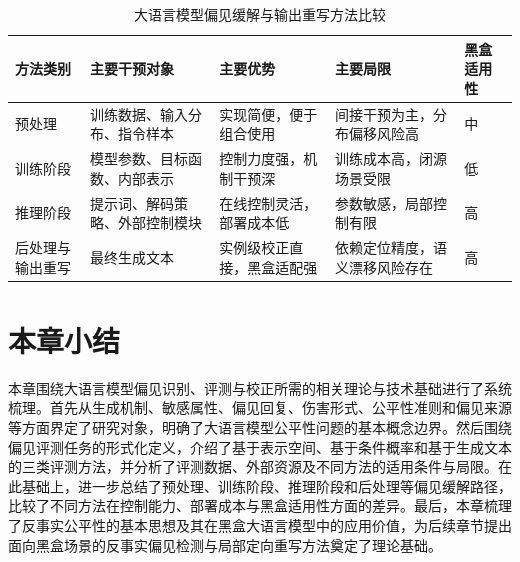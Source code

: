 \begin{table}[hbt]
    \centering
    \caption{大语言模型偏见缓解与输出重写方法比较}
    \label{tab:bias-mitigation-compare}
    \small
    \renewcommand{\tabularxcolumn}[1]{m{#1}}
    \begin{tabularx}{\textwidth}{>{\centering\arraybackslash}m{2.2cm}>{\centering\arraybackslash}m{3.0cm}>{\centering\arraybackslash}X>{\centering\arraybackslash}X>{\centering\arraybackslash}m{1.4cm}}
        \toprule
        方法类别 & 主要干预对象 & 主要优势 & 主要局限 & 黑盒适用性 \\
        \midrule
        预处理\cite{DBLP:journals/coling/GallegosRBTKDYZA24,DBLP:conf/birthday/LuMWAD20,DBLP:conf/emnlp/MaudslayGCT19,DBLP:conf/acl/GhanbarzadehHPM23,DBLP:conf/emnlp/DinanFWUKW20,DBLP:conf/nips/SolaimanD21} & 训练数据、输入分布、指令样本 & 实现简便，便于组合使用 & 间接干预为主，分布偏移风险高 & 中 \\
        训练阶段\cite{DBLP:conf/acl/RavfogelEGTG20,DBLP:conf/acl/LiangLZLSM20,DBLP:conf/icassp/WooNJL23,DBLP:conf/acl/GuoYA22,DBLP:conf/emnlp/GaciBCB22,DBLP:conf/acl/ZhengK0H23,DBLP:conf/naacl/JinBKDNR21} & 模型参数、目标函数、内部表示 & 控制力度强，机制干预深 & 训练成本高，闭源场景受限 & 低 \\
        推理阶段\cite{DBLP:conf/acl/SaundersSB22,DBLP:conf/emnlp/MeadeGHGJRLH23,DBLP:conf/acl/LiuKW23,DBLP:conf/acl/HauzenbergerMKS23} & 提示词、解码策略、外部控制模块 & 在线控制灵活，部署成本低 & 参数敏感，局部控制有限 & 高 \\
        后处理与输出重写\cite{DBLP:conf/aaai/PryzantMDKJY20,DBLP:conf/acl/AmrheinSSL23,DBLP:conf/emnlp/MajumderHM23} & 最终生成文本 & 实例级校正直接，黑盒适配强 & 依赖定位精度，语义漂移风险存在 & 高 \\
        \bottomrule
    \end{tabularx}
\end{table}


\section{本章小结}

本章围绕大语言模型偏见识别、评测与校正所需的相关理论与技术基础进行了系统梳理。首先从生成机制、敏感属性、偏见回复、伤害形式、公平性准则和偏见来源等方面界定了研究对象，明确了大语言模型公平性问题的基本概念边界。然后围绕偏见评测任务的形式化定义，介绍了基于表示空间、基于条件概率和基于生成文本的三类评测方法，并分析了评测数据、外部资源及不同方法的适用条件与局限。在此基础上，进一步总结了预处理、训练阶段、推理阶段和后处理等偏见缓解路径，比较了不同方法在控制能力、部署成本与黑盒适用性方面的差异。最后，本章梳理了反事实公平性的基本思想及其在黑盒大语言模型中的应用价值，为后续章节提出面向黑盒场景的反事实偏见检测与局部定向重写方法奠定了理论基础。
